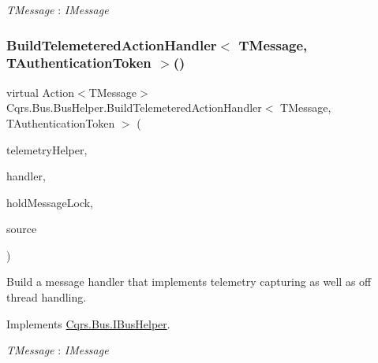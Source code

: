 \begin{Desc}
\item[Type Constraints]\begin{description}
\item[{\em T\+Message} : {\em I\+Message}]\end{description}
\end{Desc}
\mbox{\label{classCqrs_1_1Bus_1_1BusHelper_a7edd5b2ac0d46ce225e592f857f6d525_a7edd5b2ac0d46ce225e592f857f6d525}} 
\subsubsection{\texorpdfstring{Build\+Telemetered\+Action\+Handler$<$ T\+Message, T\+Authentication\+Token $>$()}{BuildTelemeteredActionHandler< TMessage, TAuthenticationToken >()}}
{\footnotesize\ttfamily virtual Action$<$T\+Message$>$ Cqrs.\+Bus.\+Bus\+Helper.\+Build\+Telemetered\+Action\+Handler$<$ T\+Message, T\+Authentication\+Token $>$ (\begin{DoxyParamCaption}\item[{I\+Telemetry\+Helper}]{telemetry\+Helper,  }\item[{Action$<$ T\+Message $>$}]{handler,  }\item[{bool}]{hold\+Message\+Lock,  }\item[{string}]{source }\end{DoxyParamCaption})\hspace{0.3cm}{\ttfamily [virtual]}}



Build a message handler that implements telemetry capturing as well as off thread handling. 



Implements \hyperlink{interfaceCqrs_1_1Bus_1_1IBusHelper_a29751c186da5e2b042067af6a1be6d5d_a29751c186da5e2b042067af6a1be6d5d}{Cqrs.\+Bus.\+I\+Bus\+Helper}.

\begin{Desc}
\item[Type Constraints]\begin{description}
\item[{\em T\+Message} : {\em I\+Message}]\end{description}
\end{Desc}
\mbox{\label{classCqrs_1_1Bus_1_1BusHelper_a28c675e976adbf348637ec6ff6410c1a_a28c675e976adbf348637ec6ff6410c1a}} 

